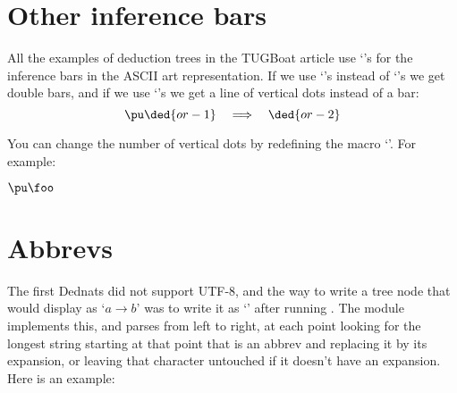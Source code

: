 \documentclass[oneside]{article}
\def\msk{\medskip}
\begin{document}
\section{Other inference bars}


All the examples of deduction trees in the TUGBoat article use
`\co{-}'s for the inference bars in the ASCII art representation. If
we use `\co{=}'s instead of `\co{-}'s we get double bars, and if we
use `\co{:}'s we get a line of vertical dots instead of a bar:
$$\pu \ded{or-1} \quad\Longrightarrow\quad \ded{or-2}$$

You can change the number of vertical dots by redefining the macro
`\co{\\DeduceSym}'. For example:

\msk

%
%
$\pu\foo$




%

\section{Abbrevs}

The first Dednats did not support UTF-8, and the way to write a tree
node that would display as `$a→b$' was to write it as `'
after running . The module
 implements this, and  parses
 from left to right, at each point looking for the longest
string starting at that point that is an abbrev and replacing it by
its expansion, or leaving that character untouched if it doesn't have
an expansion. Here is an example:
\end{document}
